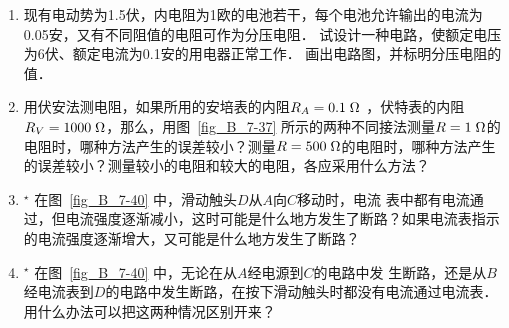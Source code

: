 \begin{enumerate}
\item 现有电动势为1.5伏，内电阻为1欧的电池若干，每个电池允许输出的电流为0.05安，又有不同阻值的电阻可作为分压电阻．
试设计一种电路，使额定电压为6伏、额定电流为0.1安的用电器正常工作．
画出电路图，并标明分压电阻的值．
\item 用伏安法测电阻，如果所用的安培表的内阻$R_A=0.1 \;\Omega $
，伏特表的内阻$R_V=1000 \;\Omega $，那么，用图~\ref{fig_B_7-37} 所示的两种不同接法测量$R=1 \;\Omega $的电阻时，哪种方法产生的误差较小？测量$R=500 \;\Omega $的电阻时，哪种方法产生的误差较小？测量较小的电阻和较大的电阻，各应采用什么方法？
\item$^\star$ 在图~\ref{fig_B_7-40} 中，滑动触头$D$从$A$向$C$移动时，电流
表中都有电流通过，但电流强度逐渐减小，这时可能是什么地方发生了断路？如果电流表指示的电流强度逐渐增大，又可能是什么地方发生了断路？
\item$^\star$ 在图~\ref{fig_B_7-40} 中，无论在从$A$经电源到$C$的电路中发
生断路，还是从$B$经电流表到$D$的电路中发生断路，在按下滑动触头时都没有电流通过电流表．用什么办法可以把这两种情况区别开来？
\end{enumerate}






